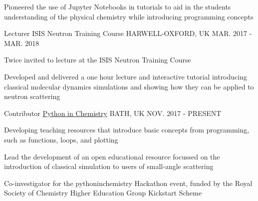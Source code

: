 \begin{cventries}
{\begin{cvitems}
			\item {Pioneered the use of Jupyter Notebooks in tutorials to aid in the students understanding of the physical chemistry while introducing programming concepts}
		\end{cvitems}
	}
	\cventry
	{Lecturer}
	{ISIS Neutron Training Course}
	{HARWELL-OXFORD, UK}
	{MAR. 2017 - MAR. 2018}
	{
		\begin{cvitems}
			\item {Twice invited to lecture at the ISIS Neutron Training Course}
			\item {Developed and delivered a one hour lecture and interactive tutorial introducing classical molecular dynamics simulations and showing how they can be applied to neutron scattering}
		\end{cvitems}
	}
	\cventry
	{Contributor}
	{\href{https://pythoninchemistry.org}{Python in Chemistry}}
	{BATH, UK}
	{NOV. 2017 - PRESENT}
	{
		\begin{cvitems}
			\item {Developing teaching resources that introduce basic concepts from programming, such as functions, loops, and plotting}
			\item {Lead the development of an open educational resource focussed on the introduction of classical simulation to users of small-angle scattering}
			\item {Co-investigator for the pythoninchemistry Hackathon event, funded by the Royal Society of Chemistry Higher Education Group Kickstart Scheme}
		\end{cvitems}
	}
\end{cventries}
